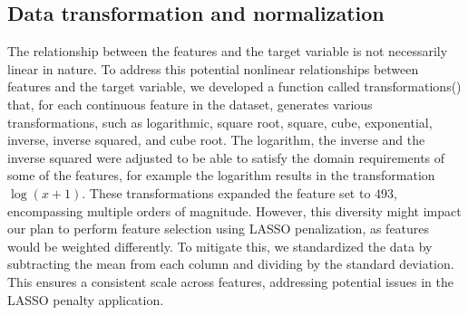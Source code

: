 \documentclass[12pt]{article}
\begin{document}
\subsection{Data transformation and normalization}
The relationship between the features and the target variable is not necessarily linear in nature. To address this potential nonlinear relationships between features and the target variable, we developed a function called transformations() that, for each continuous feature in the dataset, generates various transformations, such as logarithmic, square root, square, cube, exponential, inverse, inverse squared, and cube root. The logarithm, the inverse and the inverse squared were adjusted to be able to satisfy the domain requirements of some of the features, for example the logarithm results in the transformation $\log(x+1)$. These transformations expanded the feature set to $493$, encompassing multiple orders of magnitude. However, this diversity might impact our plan to perform feature selection using LASSO penalization, as features would be weighted differently. To mitigate this, we standardized the data by subtracting the mean from each column and dividing by the standard deviation. This ensures a consistent scale across features, addressing potential issues in the LASSO penalty application.
\end{document}

